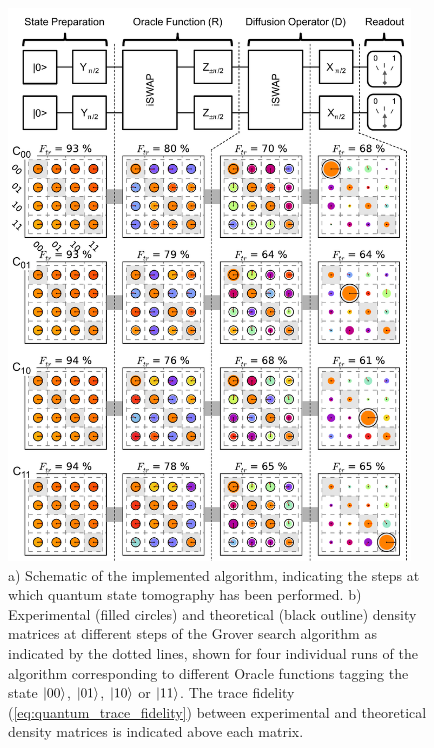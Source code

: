 \begin{figure}[hp!]
	\centering
		\includegraphics[width=0.95\textwidth]{"./data/ct5/2011_04_21 - grover and tomo/good_data/grover algorithm - summary"}
	\caption{a) Schematic of the implemented algorithm, indicating the steps at which quantum state tomography has been performed. b) Experimental (filled circles) and theoretical (black outline) density matrices at different steps of the Grover search algorithm as indicated by the dotted lines, shown for four individual runs of the algorithm corresponding to different Oracle functions tagging the state ${\left| 00 \right>}$, ${\left| 01 \right>}$, ${\left| 10 \right>}$ or ${\left| 11 \right>}$. The trace fidelity (\ref{eq:quantum_trace_fidelity}) between experimental and theoretical density matrices is indicated above each matrix.}
	\label{fig:GroverAlgorithmExperimentalResults}
\end{figure}

